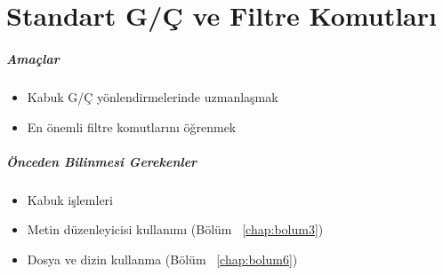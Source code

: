 \chapter{Standart G/Ç ve Filtre Komutları}
\label{chap:bolum8}
\paragraph{Amaçlar}{
\begin{itemize}
\item Kabuk G/Ç yönlendirmelerinde uzmanlaşmak
\item En önemli filtre komutlarını öğrenmek
\end{itemize}
}
\paragraph{Önceden Bilinmesi Gerekenler}{
\begin{itemize}
 \item Kabuk işlemleri
 \item Metin düzenleyicisi kullanımı (Bölüm ~\ref{chap:bolum3})
 \item Dosya ve dizin kullanma (Bölüm ~\ref{chap:bolum6})
 \end{itemize}
}

